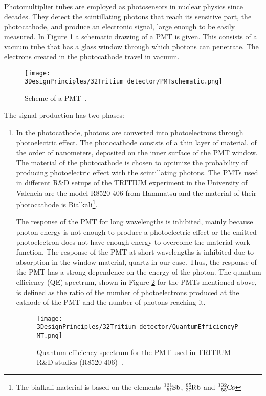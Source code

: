 Photomultiplier tubes are employed as photosensors in nuclear physics since decades. They detect the scintillating photons that reach its sensitive part, the photocathode, and produce an electronic signal, large enough to be easily measured. In Figure \ref{fig:SchemePMT} a schematic drawing of a PMT is given. This consists of a vacuum tube that has a glass window through which photons can penetrate. The electrons created in the photocathode travel in vacuum. 

\begin{figure}[htbp]
\centering
\texttt{[image: 3DesignPrinciples/32Tritium\_detector/PMTschematic.png]}
\caption{Scheme of a PMT\label{fig:SchemePMT}~\cite{Knoll}.}
\end{figure}

The signal production has two phases:
\begin{enumerate}
\item{} In the photocathode, photons are converted into photoelectrons through photoelectric effect. The photocathode consists of a thin layer of material, of the order of nanometers, deposited on the inner surface of the PMT window. The material of the photocathode is chosen to optimize the probability of producing photoelectric effect with the scintillating photons. The PMTs used in different R\&D setups of the TRITIUM experiment in the University of Valencia are the model R8520-406 from Hammatsu \cite{DataSheetPMTs} and the material of their photocathode is Bialkali\footnote{The bialkali material is based on the elements $\ce{^{121}_{51}Sb}$, $\ce{^{85}_{37}Rb}$ and $\ce{^{132}_{55}Cs}$}.

The response of the PMT for long wavelengths is inhibited, mainly because photon energy is not enough to produce a photoelectric effect or the emitted photoelectron does not have enough energy to overcome the material-work function. The response of the PMT at short wavelengths is inhibited due to absorption in the window material, quartz in our case. Thus, the response of the PMT has a strong dependence on the energy of the photon. The quantum efficiency (QE)  spectrum, shown in Figure \ref{fig:QuantumEfficiencyPMT} for the PMTs mentioned above, is defined as the ratio of the number of photoelectrons produced at the cathode of the PMT and the number of photons reaching it.

\begin{figure}[htbp]
\centering
\texttt{[image: 3DesignPrinciples/32Tritium\_detector/QuantumEfficiencyPMT.png]}
\caption{Quantum efficiency spectrum for the PMT used in TRITIUM R\&D studies (R8520-406)\label{fig:QuantumEfficiencyPMT}~\cite{DataSheetPMTs}.}
\end{figure}


\end{enumerate}
